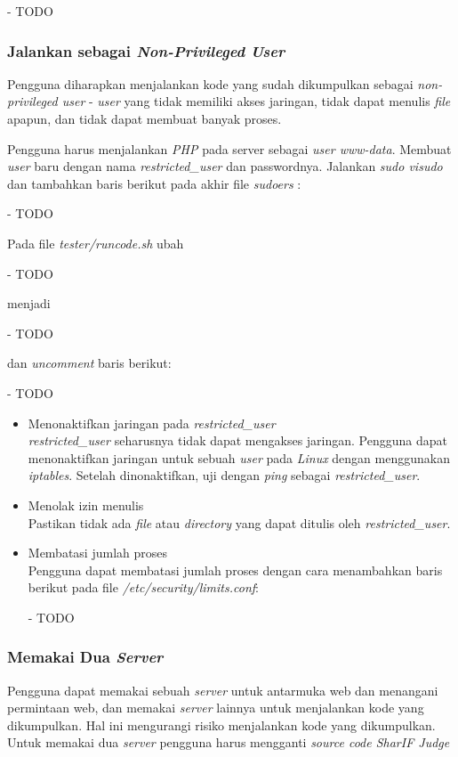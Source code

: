 - TODO

\subsubsection{Jalankan sebagai \textit{Non-Privileged User}}
Pengguna diharapkan menjalankan kode yang sudah dikumpulkan sebagai \textit{non-privileged user} - \textit{user} yang tidak memiliki akses jaringan, tidak dapat menulis \textit{file} apapun, dan tidak dapat membuat banyak proses.

Pengguna harus menjalankan \textit{PHP} pada server sebagai \textit{user www-data}. Membuat \textit{user} baru dengan nama \textit{restricted\_user} dan passwordnya. Jalankan \textit{sudo visudo} dan tambahkan baris berikut pada akhir file \textit{sudoers} :

- TODO

Pada file \textit{tester/runcode.sh} ubah 

- TODO

menjadi

- TODO

dan \textit{uncomment} baris berikut:

- TODO

\begin{itemize}
	\item Menonaktifkan jaringan pada \textit{restricted\_user} \\
	\textit{restricted\_user} seharusnya tidak dapat mengakses jaringan. Pengguna dapat menonaktifkan jaringan untuk sebuah \textit{user} pada \textit{Linux} dengan menggunakan \textit{iptables}. Setelah dinonaktifkan, uji dengan \textit{ping} sebagai \textit{restricted\_user}.
	
	\item Menolak izin menulis \\
	Pastikan tidak ada \textit{file} atau \textit{directory} yang dapat ditulis oleh \textit{restricted\_user}.
	
	\item Membatasi jumlah proses \\
	Pengguna dapat membatasi jumlah proses dengan cara menambahkan baris berikut pada file \textit{/etc/security/limits.conf}:
	
	- TODO
	
\end{itemize}

\subsubsection{Memakai Dua \textit{Server}}
Pengguna dapat memakai sebuah \textit{server} untuk antarmuka web dan menangani permintaan web, dan memakai \textit{server} lainnya untuk menjalankan kode yang dikumpulkan. Hal ini mengurangi risiko menjalankan kode yang dikumpulkan. Untuk memakai dua \textit{server} pengguna harus mengganti \textit{source code SharIF Judge} 


